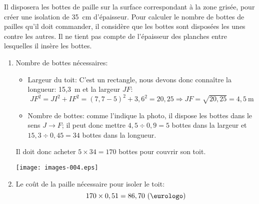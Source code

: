 \begin{enumerate}
Il disposera les bottes de paille sur la surface correspondant à la zone grisée, pour créer une isolation de 35~cm d'épaisseur. Pour calculer le nombre de bottes de pailles qu'il doit commander, il considère que les bottes sont disposées les unes contre les autres. Il ne tient pas compte de l'épaisseur des planches entre lesquelles il insère les bottes.
\begin{enumerate}
\item Nombre de bottes nécessaires:
\begin{itemize}
\item Largeur du toit: C'est un rectangle, nous devons donc connaître la longueur: 15,3~m et la largeur $JF$: 
\[
JF^2=JI^2+IF^2=(7,7-5)^2+3,6^2=20,25\Longrightarrow JF=\sqrt{20,25}=4,5~\text{m}
\]
\item Nombre de bottes: comme l'indique la photo, il dispose les bottes dans le sens $J\to F$; il peut donc mettre $4,5\div 0,9=5$ bottes dans la largeur et $15,3\div 0,45=34$ bottes dans la longueur.
\end{itemize}
Il doit donc acheter $5\times 34=170$ bottes pour couvrir son toit.
\begin{center}
\hfill
\texttt{[image: images-004.eps]} 
\end{center}
\item Le coût de la paille nécessaire pour isoler le toit:
\[
170\times 0,51=86,70\ (\text{\eurologo})
\]
\end{enumerate}
\end{enumerate}

